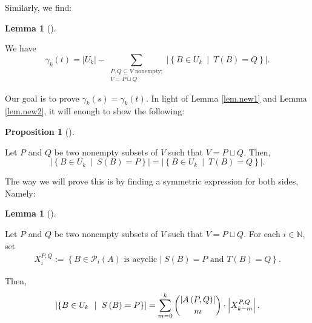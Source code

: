 \documentclass[numbers=enddot,12pt,final,onecolumn,notitlepage]{scrartcl}%
\theoremstyle{definition}
\newtheorem{lem}[theo]{Lemma}
\newenvironment{lemma}[1][]
{\begin{lem}[#1]\begin{leftbar}}
{\end{leftbar}\end{lem}}
\newtheorem{prop}[theo]{Proposition}
\newenvironment{proposition}[1][]
{\begin{prop}[#1]\begin{leftbar}}
{\end{leftbar}\end{prop}}
\let\sumnonlimits\sum
\renewcommand{\sum}{\sumnonlimits\limits}
\theoremstyle{plainsl}
\begin{document}
Similarly, we find:

\begin{lemma}
\label{lem.new2}We have%
\[
\gamma_{k}\left(  t\right)  =\left\vert U_{k}\right\vert -\sum
_{\substack{P,Q\subseteq V\text{ nonempty;}\\V=P\sqcup Q}}\left\vert \left\{
B\in U_{k}\ \mid\ T\left(  B\right)  =Q\right\}  \right\vert .
\]

\end{lemma}

Our goal is to prove $\gamma_{k}\left(  s\right)  =\gamma_{k}\left(  t\right)
$. In light of Lemma \ref{lem.new1} and Lemma \ref{lem.new2}, it will enough
to show the following:

\begin{proposition}
\label{prop.new3}Let $P$ and $Q$ be two nonempty subsets of $V$ such that
$V=P\sqcup Q$. Then,%
\[
\left\vert \left\{  B\in U_{k}\ \mid\ S\left(  B\right)  =P\right\}
\right\vert =\left\vert \left\{  B\in U_{k}\ \mid\ T\left(  B\right)
=Q\right\}  \right\vert .
\]

\end{proposition}

The way we will prove this is by finding a symmetric expression for both
sides, Namely:

\begin{lemma}
\label{lem.new4}Let $P$ and $Q$ be two nonempty subsets of $V$ such that
$V=P\sqcup Q$.
For each $i \in \mathbb{N}$, set
\begin{align*}
    X_i^{P,Q} := \left\{B \in \mathcal{P}_i(A) \text{ is acyclic} \mid S(B) = P \text{ and } T(B) = Q\right\}.
\end{align*}


Then,%
\[
\left\vert \left\{  B\in U_{k}\ \mid\ S\left(  B\right)  =P\right\}
\right\vert =\sum_{m=0}^{k}\dbinom{\left\vert A\left(  P,Q\right)  \right\vert
}{m}\cdot\left\vert X_{k-m}^{P,Q}\right\vert .
\]

\end{lemma}
\end{document}
